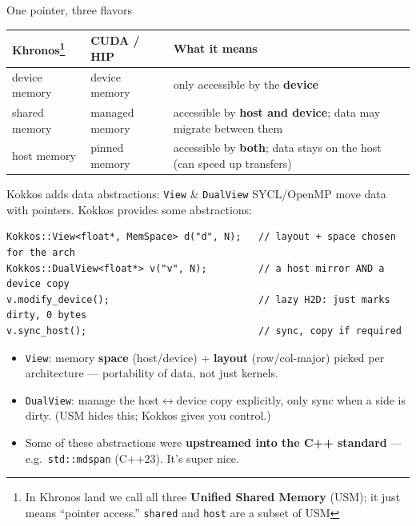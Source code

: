 \begin{frame}{One pointer, three flavors}

\begin{center}
\begin{tabular}{@{}ll p{4.9cm}@{}}
\toprule
Khronos\footnote{In Khronos land we call all three \textbf{Unified Shared Memory} (USM); it just means ``pointer access.'' \texttt{shared} and \texttt{host} are a subset of USM} & CUDA / HIP & What it means \\
\midrule
device memory & device memory  & only accessible by the \textbf{device} \\
shared memory & managed memory & accessible by \textbf{host and device}; data may migrate between them \\
host memory   & pinned memory  & accessible by \textbf{both}; data stays on the host (can speed up transfers) \\
\bottomrule
\end{tabular}
\end{center}


\end{frame}

\begin{frame}[fragile]{Kokkos adds data abstractions: \texttt{View} \& \texttt{DualView}}
SYCL/OpenMP move data with pointers. Kokkos provides some abstractions:

\begin{verbatim}
Kokkos::View<float*, MemSpace> d("d", N);   // layout + space chosen for the arch
Kokkos::DualView<float*> v("v", N);         // a host mirror AND a device copy
v.modify_device();                          // lazy H2D: just marks dirty, 0 bytes
v.sync_host();                              // sync, copy if required
\end{verbatim}
\begin{itemize}
    \item \texttt{View}: memory \textbf{space} (host/device) + \textbf{layout}
          (row/col-major) picked per architecture --- portability of data, not
          just kernels.
    \item \texttt{DualView}: manage the host$\leftrightarrow$device copy explicitly,
          only sync when a side is dirty. (USM hides this; Kokkos gives you control.)
    \item Some of these abstractions were \textbf{upstreamed into the C++ standard} ---
          e.g.\ \texttt{std::mdspan} (C++23). It's super nice.
\end{itemize}
\end{frame}

